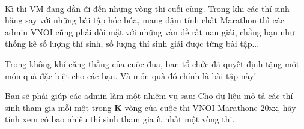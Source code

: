 

Kì thi VM đang dần đi đến những vòng thi cuối cùng. Trong khi các thí sinh hăng say với những bài tập hóc búa, mang đậm tính chất Marathon thì các admin VNOI cũng phải đối mặt với những vấn đề rất nan giải, chẳng hạn như thống kê số lượng thí sinh, số lượng thí sinh giải được từng bài tập...

Trong không khí căng thẳng của cuộc đua, ban tổ chức đã quyết định tặng một món quà đặc biệt cho các bạn. Và món quà đó chính là bài tập này!

Bạn sẽ phải giúp các admin làm một nhiệm vụ sau: Cho dữ liệu mô tả các thí sinh tham gia mỗi một trong \textbf{ K } vòng của cuộc thi VNOI Marathone 20xx, hãy tính xem có bao nhiêu thí sinh tham gia ít nhất một vòng thi.